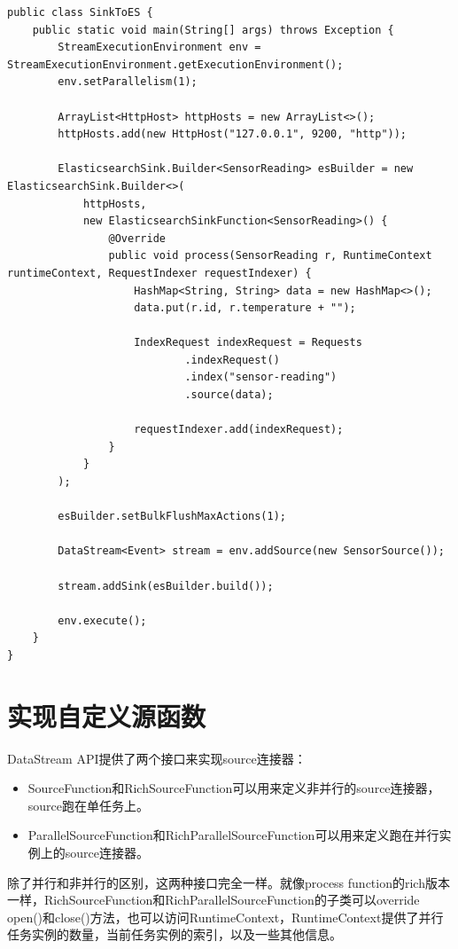 \documentclass[cn,11pt,chinese]{elegantbook}
\begin{document}
\begin{verbatim}
public class SinkToES {
    public static void main(String[] args) throws Exception {
        StreamExecutionEnvironment env = StreamExecutionEnvironment.getExecutionEnvironment();
        env.setParallelism(1);

        ArrayList<HttpHost> httpHosts = new ArrayList<>();
        httpHosts.add(new HttpHost("127.0.0.1", 9200, "http"));

        ElasticsearchSink.Builder<SensorReading> esBuilder = new ElasticsearchSink.Builder<>(
            httpHosts,
            new ElasticsearchSinkFunction<SensorReading>() {
                @Override
                public void process(SensorReading r, RuntimeContext runtimeContext, RequestIndexer requestIndexer) {
                    HashMap<String, String> data = new HashMap<>();
                    data.put(r.id, r.temperature + "");

                    IndexRequest indexRequest = Requests
                            .indexRequest()
                            .index("sensor-reading")
                            .source(data);

                    requestIndexer.add(indexRequest);
                }
            }
        );

        esBuilder.setBulkFlushMaxActions(1);

        DataStream<Event> stream = env.addSource(new SensorSource());

        stream.addSink(esBuilder.build());

        env.execute();
    }
}
\end{verbatim}

\section{实现自定义源函数}

DataStream API提供了两个接口来实现source连接器：

\begin{itemize}
    \item SourceFunction和RichSourceFunction可以用来定义非并行的source连接器，source跑在单任务上。
    \item ParallelSourceFunction和RichParallelSourceFunction可以用来定义跑在并行实例上的source连接器。
\end{itemize}

除了并行和非并行的区别，这两种接口完全一样。就像process function的rich版本一样，RichSourceFunction和RichParallelSourceFunction的子类可以override open()和close()方法，也可以访问RuntimeContext，RuntimeContext提供了并行任务实例的数量，当前任务实例的索引，以及一些其他信息。
\end{document}
